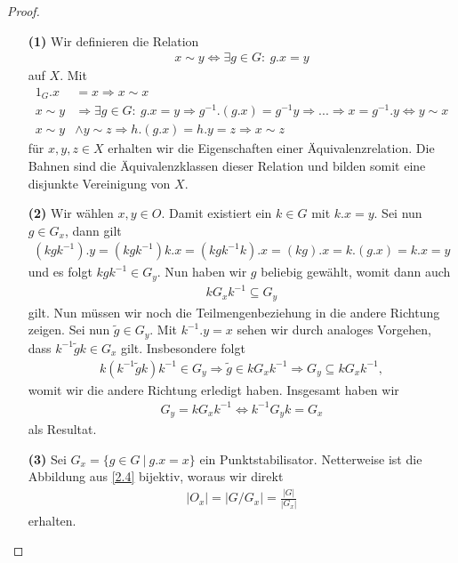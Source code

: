 \begin{proof}\
\begin{enumerate}
\item[\textbf{(1)}]
Wir definieren die Relation
\begin{align*}
x \sim y \Leftrightarrow \exists g \in G : \ g.x=y 
\end{align*}
auf $X$. Mit 
\begin{align*}
1_G.x &= x  \Rightarrow x \sim x\\
x \sim y  &\Rightarrow \exists g \in G : \ g.x= y
\Rightarrow g^{-1}.(g.x) = g^{-1} y
\Rightarrow ... \Rightarrow x = g^{-1}.y 
\Leftrightarrow y \sim x\\
x \sim y &\wedge y \sim z 
\Rightarrow h.(g.x) = h.y = z  
\Rightarrow x \sim z
\end{align*}
für $x,y,z \in X$ erhalten wir die Eigenschaften einer Äquivalenzrelation.
Die Bahnen sind die Äquivalenzklassen dieser Relation und bilden somit eine disjunkte Vereinigung von $X$.
\item[\textbf{(2)}]
Wir wählen $x,y \in O$. Damit existiert ein $k \in G$ mit $k.x = y$.
Sei nun $g \in G_x$, dann gilt
\begin{align*}
(kgk^{-1}).y= (kgk^{-1})k.x =  (kgk^{-1}k).x = (kg).x = k.(g.x) = k.x = y
\end{align*}
und es folgt $kgk^{-1} \in G_y$. Nun haben wir $g$ beliebig gewählt, womit dann auch 
\begin{align*}
k G_x k^{-1} \subseteq G_y 
\end{align*}
gilt.
Nun müssen wir noch die Teilmengenbeziehung in die andere Richtung zeigen.
Sei nun $\tilde{g} \in G_y$. Mit $k^{-1}.y =x$ sehen wir durch analoges Vorgehen, dass
$k^{-1} \tilde{g} k \in G_x$ gilt. Insbesondere folgt
\begin{align*}
k (k^{-1} \tilde{g} k ) k^{-1}  \in G_y
\Rightarrow \tilde{g} \in k G_x k^{-1}
\Rightarrow G_y  \subseteq k G_x k^{-1},
\end{align*}
womit wir die andere Richtung erledigt haben.
Insgesamt haben wir 
\begin{align*}
G_y = k G_x k^{-1} \Leftrightarrow k^{-1} G_y k = G_x
\end{align*}
als Resultat.
\item[\textbf{(3)}]
Sei $G_x = \lbrace g \in G \ | \ g.x= x \rbrace$ ein Punktstabilisator.
Netterweise ist die Abbildung aus \ref{2.4} bijektiv, woraus wir direkt
\begin{align*}
|O_x| = | G / G_x| = \frac{|G|}{|G_x|} 
\end{align*}
erhalten.
\end{enumerate}
\end{proof}

